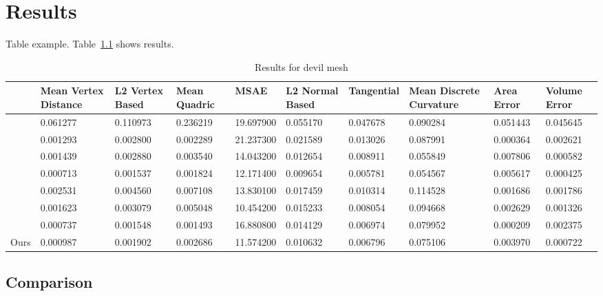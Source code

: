 
\chapter{Results}
\label{cha:Results}

Table example. Table~\ref{tab:res} shows results. 

\begin{table}[!h]
\caption{Results for devil mesh}
\tiny
\begin{center}
\begin{tabular}{ m{1.1cm} m{0.95cm} m{0.95cm} m{0.95cm} m{0.95cm} m{0.95cm} m{0.95cm} m{0.95cm} m{0.95cm} m{0.95cm} } 
 & Mean Vertex Distance & L2 Vertex Based & Mean Quadric & MSAE & L2 Normal Based & Tangential & Mean Discrete Curvature & Area Error & Volume Error\\ 
 \hline 
\cite{FDC03} & 0.061277 & 0.110973 & 0.236219 & 19.697900 & 0.055170 & 0.047678 & 0.090284 & 0.051443 & 0.045645 \\ 
 \cite{JDD03} & 0.001293 & 0.002800 & 0.002289 & 21.237300 & 0.021589 & 0.013026 & 0.087991 & 0.000364 & 0.002621 \\ 
 \cite{SRML07} & 0.001439 & 0.002880 & 0.003540 & 14.043200 & 0.012654 & 0.008911 & 0.055849 & 0.007806 & 0.000582 \\ 
 \cite{ZFAT11} & \cellcolor{blue!25}0.000713 & \cellcolor{blue!25}0.001537 & 0.001824 & 12.171400 & \cellcolor{blue!25}0.009654 & \cellcolor{blue!25}0.005781 & \cellcolor{blue!25}0.054567 & 0.005617 & \cellcolor{blue!25}0.000425 \\ 
 \cite{HS13} & 0.002531 & 0.004560 & 0.007108 & 13.830100 & 0.017459 & 0.010314 & 0.114528 & 0.001686 & 0.001786 \\ 
 \cite{ZDZBL15} & 0.001623 & 0.003079 & 0.005048 & \cellcolor{blue!25}10.454200 & 0.015233 & 0.008054 & 0.094668 & 0.002629 & 0.001326 \\ 
 \cite{YRP16} & 0.000737 & 0.001548 & \cellcolor{blue!25}0.001493 & 16.880800 & 0.014129 & 0.006974 & 0.079952 & \cellcolor{blue!25}0.000209 & 0.002375 \\ 
 Ours & 0.000987 & 0.001902 & 0.002686 & 11.574200 & 0.010632 & 0.006796 & 0.075106 & 0.003970 & 0.000722 \\ 
 \end{tabular}
\end{center}
 \label{tab:res}
\end{table}

\section{Comparison}